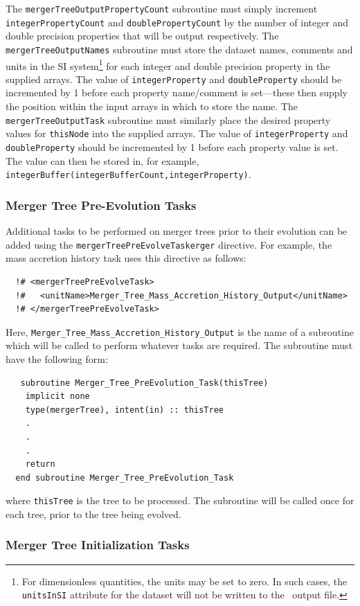 The {\tt mergerTreeOutputPropertyCount} subroutine must simply increment {\tt integerPropertyCount} and {\tt doublePropertyCount} by the number of integer and double precision properties that will be output respectively. The {\tt mergerTreeOutputNames} subroutine must store the dataset names, comments and units in the SI system\footnote{For dimensionless quantities, the units may be set to zero. In such cases, the {\tt unitsInSI} attribute for the dataset will not be written to the \protect\glc\ output file.} for each integer and double precision property in the supplied arrays. The value of {\tt integerProperty} and {\tt doubleProperty} should be incremented by 1 before each property name/comment is set---these then supply the position within the input arrays in which to store the name. The {\tt mergerTreeOutputTask} subroutine must similarly place the desired property values for {\tt thisNode} into the supplied arrays. The value of {\tt integerProperty} and {\tt doubleProperty} should be incremented by 1 before each property value is set. The value can then be stored in, for example, {\tt integerBuffer(integerBufferCount,integerProperty)}.

\subsubsection{Merger Tree Pre-Evolution Tasks}

Additional tasks to be performed on merger trees prior to their evolution can be added using the {\tt mergerTreePreEvolveTaskerger} directive. For example, the mass accretion history task uses this directive as follows:
\begin{verbatim}
  !# <mergerTreePreEvolveTask>
  !#   <unitName>Merger_Tree_Mass_Accretion_History_Output</unitName>
  !# </mergerTreePreEvolveTask>
\end{verbatim}
Here, {\tt Merger\_Tree\_Mass\_Accretion\_History\_Output} is the name of a subroutine which will be called to perform whatever tasks are required. The subroutine must have the following form:
\begin{verbatim}
   subroutine Merger_Tree_PreEvolution_Task(thisTree)
    implicit none
    type(mergerTree), intent(in) :: thisTree
    .
    .
    .
    return
  end subroutine Merger_Tree_PreEvolution_Task
\end{verbatim}
where {\tt thisTree} is the tree to be processed. The subroutine will be called once for each tree, prior to the tree being evolved.

\subsubsection{Merger Tree Initialization Tasks}

